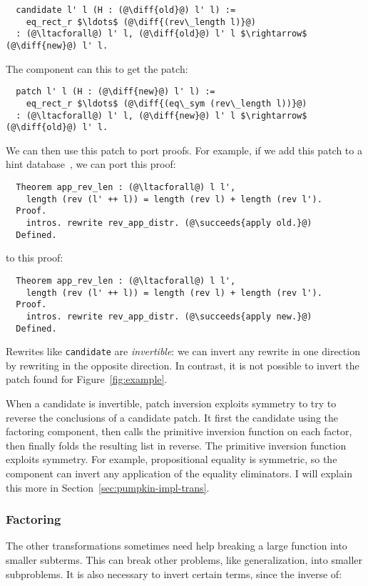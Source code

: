 \begin{lstlisting}
  candidate l' l (H : (@\diff{old}@) l' l) :=
    eq_rect_r $\ldots$ (@\diff{(rev\_length l)}@)
  : (@\ltacforall@) l' l, (@\diff{old}@) l' l $\rightarrow$ (@\diff{new}@) l' l.
\end{lstlisting}
The component can  this to get the patch: %

\begin{lstlisting}
  patch l' l (H : (@\diff{new}@) l' l) :=
    eq_rect_r $\ldots$ (@\diff{(eq\_sym (rev\_length l))}@)
  : (@\ltacforall@) l' l, (@\diff{new}@) l' l $\rightarrow$ (@\diff{old}@) l' l.
\end{lstlisting}
We can then use this patch to port proofs.
For example, if we add this patch to a hint database~\cite{hints},
we can port this proof:

\begin{lstlisting}
  Theorem app_rev_len : (@\ltacforall@) l l',
    length (rev (l' ++ l)) = length (rev l) + length (rev l').
  Proof.
    intros. rewrite rev_app_distr. (@\succeeds{apply old.}@)
  Defined.
\end{lstlisting}
to this proof:

\begin{lstlisting}
  Theorem app_rev_len : (@\ltacforall@) l l',
    length (rev (l' ++ l)) = length (rev l) + length (rev l').
  Proof.
    intros. rewrite rev_app_distr. (@\succeeds{apply new.}@)
  Defined.
\end{lstlisting}

Rewrites like \lstinline{candidate} are \textit{invertible}:
we can invert any rewrite in one direction by rewriting in the opposite direction.
In contrast, it is not possible to invert the patch \sysname
found for Figure~\ref{fig:example}.

When a candidate is invertible, patch inversion exploits symmetry to try to reverse the conclusions of a candidate patch.
It first  the candidate using the factoring component, then calls the primitive inversion
function on each factor, then finally folds the resulting list in reverse.
The primitive inversion function exploits symmetry. 
For example, propositional equality is symmetric, so the component can invert any application of the equality eliminators.
I will explain this more in Section~\ref{sec:pumpkin-impl-trans}.

\subsubsection*{Factoring} The other transformations sometimes need help breaking a large function into smaller subterms.
This can break other problems, like generalization, into smaller subproblems.
It is also necessary to invert certain terms, since the inverse of:

